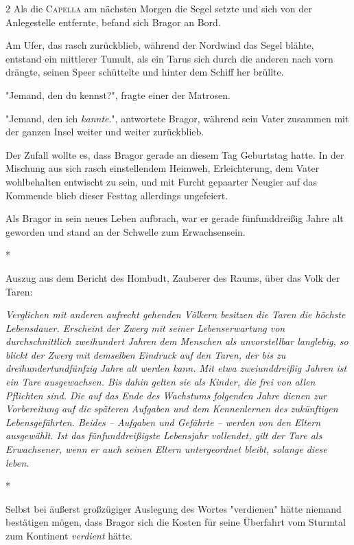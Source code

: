 \documentclass[10pt, a4paper, oneside]{book}
\begin{document}
\begin{multicols}{2}
Als die \textsc{Capella} am nächsten Morgen die Segel setzte und sich von der Anlegestelle entfernte, befand sich Bragor an Bord. 

Am Ufer, das rasch zurückblieb, während der Nordwind das Segel blähte, entstand ein mittlerer Tumult, als ein Tarus sich durch die anderen nach vorn drängte, seinen Speer schüttelte und hinter dem Schiff her brüllte. 

"Jemand, den du kennst?", fragte einer der Matrosen. 

"Jemand, den ich \textit{kannte}.", antwortete Bragor, während sein Vater zusammen mit der ganzen Insel weiter und weiter zurückblieb. 

Der Zufall wollte es, dass Bragor gerade an diesem Tag Geburtstag hatte. In der Mischung aus sich rasch einstellendem Heimweh, Erleichterung, dem Vater wohlbehalten entwischt zu sein, und mit Furcht gepaarter Neugier auf das Kommende blieb dieser Festtag allerdings ungefeiert. 

Als Bragor in sein neues Leben aufbrach, war er gerade fünfunddreißig Jahre alt geworden und stand an der Schwelle zum Erwachsensein. 

\begin{center}
    *
\end{center}

Auszug aus dem Bericht des Hombudt, Zauberer des Raums, über das Volk der 
Taren: 

\textit{Verglichen mit anderen aufrecht gehenden Völkern besitzen die Taren die höchste Lebensdauer. Erscheint der Zwerg mit seiner Lebenserwartung von durchschnittlich zweihundert Jahren dem Menschen als unvorstellbar langlebig, so blickt der Zwerg mit demselben Eindruck auf den Taren, der bis zu dreihundertundfünfzig Jahre alt werden kann. Mit etwa zweiunddreißig Jahren ist ein Tare ausgewachsen. Bis dahin gelten sie als Kinder, die frei von allen Pflichten sind. Die auf das Ende des Wachstums folgenden Jahre dienen zur Vorbereitung auf die späteren Aufgaben und dem Kennenlernen des zukünftigen Lebensgefährten. Beides – Aufgaben und Gefährte – werden von den Eltern ausgewählt. Ist das fünfunddreißigste Lebensjahr vollendet, gilt der Tare als Erwachsener, wenn er auch seinen Eltern untergeordnet bleibt, solange diese leben.}

\begin{center}
    *
\end{center}

Selbst bei äußerst großzügiger Auslegung des Wortes "verdienen" hätte 
niemand bestätigen mögen, dass Bragor sich die Kosten für seine Überfahrt vom Sturmtal zum Kontinent \textit{verdient} hätte. 


\end{multicols}
\end{document}
